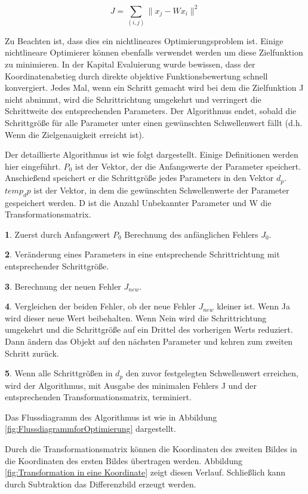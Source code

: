 \begin{equation}
   J = \sum_{(i,j)}\lVert x_j - Wx_i \rVert ^2
\end{equation}

Zu Beachten ist, dass dies ein nichtlineares Optimierungsproblem ist. Einige nichtlineare Optimierer können ebenfalls verwendet werden um diese Zielfunktion zu minimieren. In der Kapital Evaluierung wurde bewissen, dass der Koordinatenabstieg durch direkte objektive Funktionsbewertung schnell konvergiert. Jedes Mal, wenn ein Schritt gemacht wird bei dem die Zielfunktion J nicht abnimmt, wird die Schrittrichtung umgekehrt und verringert die Schrittweite des entsprechenden Parameters. Der Algorithmus endet, sobald die Schrittgröße für alle Parameter unter einen gewünschten Schwellenwert fällt (d.h. Wenn die Zielgenauigkeit erreicht ist). 

Der detaillierte Algorithmus ist wie folgt dargestellt. Einige Definitionen werden hier eingeführt. $P_0$ ist der Vektor, der die Anfangswerte der Parameter speichert. Anschießend speichert er die Schrittgröße jedes Parameters in den Vektor $d_p$. $temp_dp$ ist der Vektor, in dem die gewünschten Schwellenwerte der Parameter gespeichert werden. D ist die Anzahl Unbekannter Parameter und W die Transformationsmatrix.

\textbf{1}. Zuerst durch Anfangswert $P_0$ Berechnung des anfänglichen Fehlers $J_0$.

\textbf{2}. Veränderung eines Parameters in eine entsprechende Schrittrichtung mit entsprechender Schrittgröße.

\textbf{3}. Berechnung der neuen Fehler $J_{new}$.

\textbf{4}. Vergleichen der beiden Fehler, ob der neue Fehler $J_{new}$ kleiner ist. Wenn Ja wird dieser neue Wert beibehalten. Wenn Nein wird die Schrittrichtung umgekehrt und die Schrittgröße auf ein Drittel des vorherigen Werts reduziert. Dann ändern das Objekt auf den nächsten Parameter und kehren zum zweiten Schritt zurück.

\textbf{5}. Wenn alle Schrittgrößen in $d_p$ den zuvor festgelegten Schwellenwert erreichen, wird der Algorithmus, mit Ausgabe des minimalen Fehlers J und der entsprechenden Transformationsmatrix, terminiert.

Das Flussdiagramm des Algorithmus ist wie in Abbildung \ref{fig:FlussdiagrammforOptimierung} dargestellt.

Durch die Transformationsmatrix können die Koordinaten des zweiten Bildes in die Koordinaten des ersten Bildes übertragen werden. Abbildung \ref{fig:Transformation in eine Koordinate} zeigt diesen Verlauf. Schließlich kann durch Subtraktion das Differenzbild erzeugt werden.

